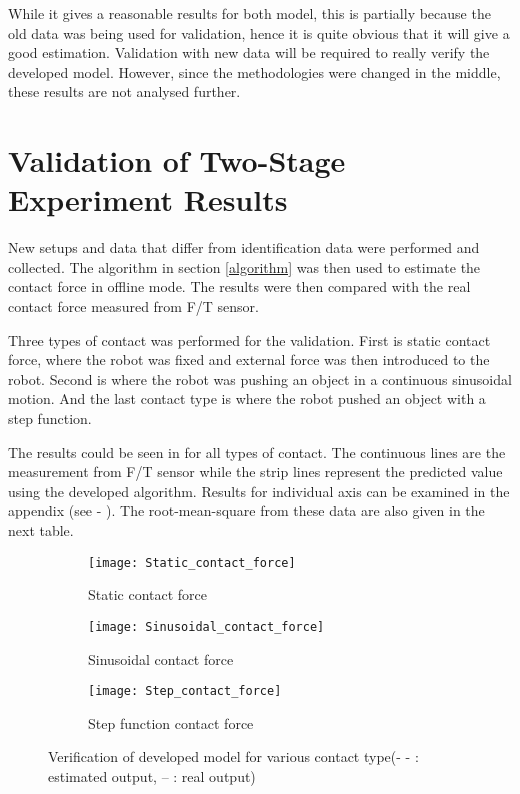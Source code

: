 While it gives a reasonable results for both model, this is partially because the old data was being used for validation, hence it is quite obvious that it will give a good estimation. Validation with new data will be required to really verify the developed model. However, since the methodologies were changed in the middle, these results are not analysed further.


\section{Validation of Two-Stage Experiment Results}

New setups and data that differ from identification data were performed and collected. The algorithm in section \ref{algorithm} was then used to estimate the contact force in offline mode. The results were then compared with the real contact force measured from F/T sensor. 

Three types of contact was performed for the validation. First is static contact force, where the robot was fixed and external force was then introduced to the robot. Second is where the robot was pushing an object in a continuous sinusoidal motion. And the last contact type is where the robot pushed an object with a step function.  

The results could be seen in  for all types of contact. The continuous lines are the measurement from F/T sensor while the strip lines represent the predicted value using the developed algorithm. Results for individual axis can be examined in the appendix (see  - ). The root-mean-square from these data are also given in the next table.

\begin{figure}[H]
  \begin{subfigure}[t]{0.5\textwidth}
    \centering
    \texttt{[image: Static\_contact\_force]} 
    \caption{Static contact force}
  \end{subfigure}
  \begin{subfigure}[t]{0.5\textwidth}
    \centering
    \texttt{[image: Sinusoidal\_contact\_force]}
    \caption{Sinusoidal contact force}
  \end{subfigure}
  \begin{subfigure}[t]{0.5\textwidth}
    \centering
    \texttt{[image: Step\_contact\_force]}
    \caption{Step function contact force}
  \end{subfigure}
  \caption{Verification of developed model for various contact type(- - : estimated output, -- : real output)}
  \label{fig:force validation 2}
\end{figure}

